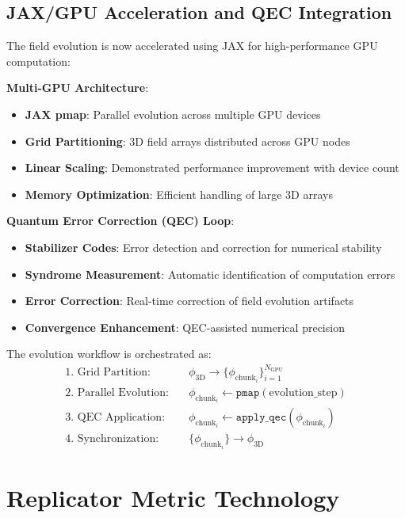 \documentclass[11pt]{article}
\begin{document}
\subsection{JAX/GPU Acceleration and QEC Integration}

The field evolution is now accelerated using JAX for high-performance GPU computation:

\textbf{Multi-GPU Architecture}:
\begin{itemize}
\item \textbf{JAX pmap}: Parallel evolution across multiple GPU devices
\item \textbf{Grid Partitioning}: 3D field arrays distributed across GPU nodes
\item \textbf{Linear Scaling}: Demonstrated performance improvement with device count
\item \textbf{Memory Optimization}: Efficient handling of large 3D arrays
\end{itemize}

\textbf{Quantum Error Correction (QEC) Loop}:
\begin{itemize}
\item \textbf{Stabilizer Codes}: Error detection and correction for numerical stability
\item \textbf{Syndrome Measurement}: Automatic identification of computation errors
\item \textbf{Error Correction}: Real-time correction of field evolution artifacts
\item \textbf{Convergence Enhancement}: QEC-assisted numerical precision
\end{itemize}

The evolution workflow is orchestrated as:
\begin{align}
\text{1. Grid Partition:} &\quad \phi_{\text{3D}} \to \{\phi_{\text{chunk}_i}\}_{i=1}^{N_{\text{GPU}}} \\
\text{2. Parallel Evolution:} &\quad \phi_{\text{chunk}_i} \gets \texttt{pmap}(\text{evolution\_step}) \\
\text{3. QEC Application:} &\quad \phi_{\text{chunk}_i} \gets \texttt{apply\_qec}(\phi_{\text{chunk}_i}) \\
\text{4. Synchronization:} &\quad \{\phi_{\text{chunk}_i}\} \to \phi_{\text{3D}}
\end{align}

\section{Replicator Metric Technology}
\end{document}
